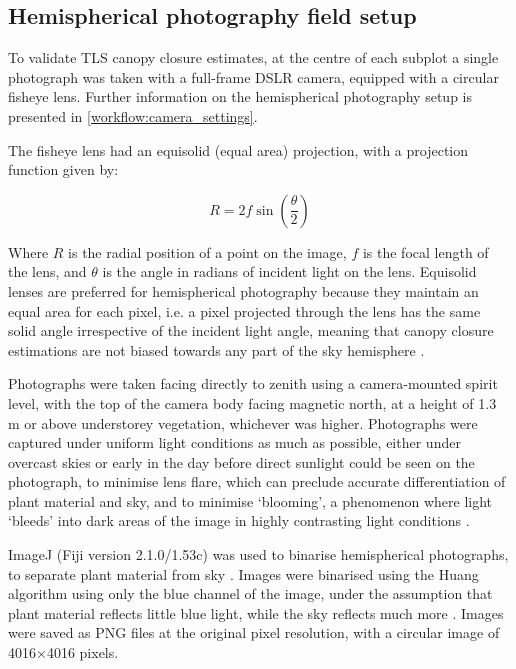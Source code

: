 \begin{refsection}
\section{Hemispherical photography field setup}

To validate TLS canopy closure estimates, at the centre of each subplot a single photograph was taken with a full-frame DSLR camera, equipped with a circular fisheye lens. Further information on the hemispherical photography setup is presented in \autoref{workflow:camera_settings}.

The fisheye lens had an equisolid (equal area) projection, with a projection function given by: 

\begin{equation}
	R = 2f \sin{(\frac{\theta{}}{2})}
\end{equation}

Where $R$ is the radial position of a point on the image, $f$ is the focal length of the lens, and $\theta{}$ is the angle in radians of incident light on the lens. Equisolid lenses are preferred for hemispherical photography because they maintain an equal area for each pixel, i.e. a pixel projected through the lens has the same solid angle irrespective of the incident light angle, meaning that canopy closure estimations are not biased towards any part of the sky hemisphere \citep{Herbert1987}.

Photographs were taken facing directly to zenith using a camera-mounted spirit level, with the top of the camera body facing magnetic north, at a height of 1.3 m or above understorey vegetation, whichever was higher. Photographs were captured under uniform light conditions as much as possible, either under overcast skies or early in the day before direct sunlight could be seen on the photograph, to minimise lens flare, which can preclude accurate differentiation of plant material and sky, and to minimise `blooming', a phenomenon where light `bleeds' into dark areas of the image in highly contrasting light conditions \citep{Frazer2001}.

ImageJ (Fiji version 2.1.0/1.53c) was used to binarise hemispherical photographs, to separate plant material from sky \citep{Schneider2012}. Images were binarised using the Huang algorithm \citep{Huang1995} using only the blue channel of the image, under the assumption that plant material reflects little blue light, while the sky reflects much more \citep{Brusa2014}. Images were saved as PNG files at the original pixel resolution, with a circular image of 4016$\times$4016 pixels.


\end{refsection}
